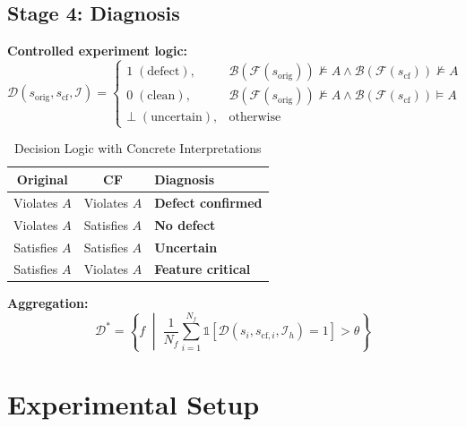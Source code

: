 \documentclass[conference]{IEEEtran}
\theoremstyle{plain}
\newcommand{\sys}{\mathcal{F}}
\newcommand{\beh}{\mathcal{B}}
\newcommand{\diag}{\mathcal{D}}
\begin{document}
\subsection{Stage 4: Diagnosis}
\textbf{Controlled experiment logic:}
\begin{equation}
\diag(s_{\text{orig}}, s_{\text{cf}}, \mathcal{I}) = 
\begin{cases}
1\;(\text{defect}), & \beh(\sys(s_{\text{orig}}))\not\models A \land \beh(\sys(s_{\text{cf}}))\not\models A \\
0\;(\text{clean}), & \beh(\sys(s_{\text{orig}}))\not\models A \land \beh(\sys(s_{\text{cf}}))\models A \\
\bot\;(\text{uncertain}), & \text{otherwise}
\end{cases}
\label{eq:diag}
\end{equation}

\begin{table}[h]
\centering
\caption{Decision Logic with Concrete Interpretations}
\label{tab:decision}
\small
\begin{tabular}{ccl}
\toprule
\textbf{Original} & \textbf{CF} & \textbf{Diagnosis}\\\midrule
\cellcolor{red!10} Violates $A$ & \cellcolor{red!10} Violates $A$ & \cellcolor{red!10} \textbf{Defect confirmed}\\
\cellcolor{green!10} Violates $A$ & \cellcolor{green!10} Satisfies $A$ & \cellcolor{green!10} \textbf{No defect}\\
\cellcolor{orange!10} Satisfies $A$ & \cellcolor{orange!10} Satisfies $A$ & \cellcolor{orange!10} \textbf{Uncertain}\\
\cellcolor{yellow!10} Satisfies $A$ & \cellcolor{yellow!10} Violates $A$ & \cellcolor{yellow!10} \textbf{Feature critical}\\
\bottomrule
\end{tabular}
\end{table}

\textbf{Aggregation:}
\begin{equation}
\mathcal{D}^* = \left\{ f \;\middle|\; \frac{1}{N_f}\sum_{i=1}^{N_f} \mathbb{1}[\diag(s_i, s_{\text{cf},i}, \mathcal{I}_h)=1] > \theta \right\}
\label{eq:agg}
\end{equation}

\section{Experimental Setup}
\label{sec:experimental}
\end{document}
